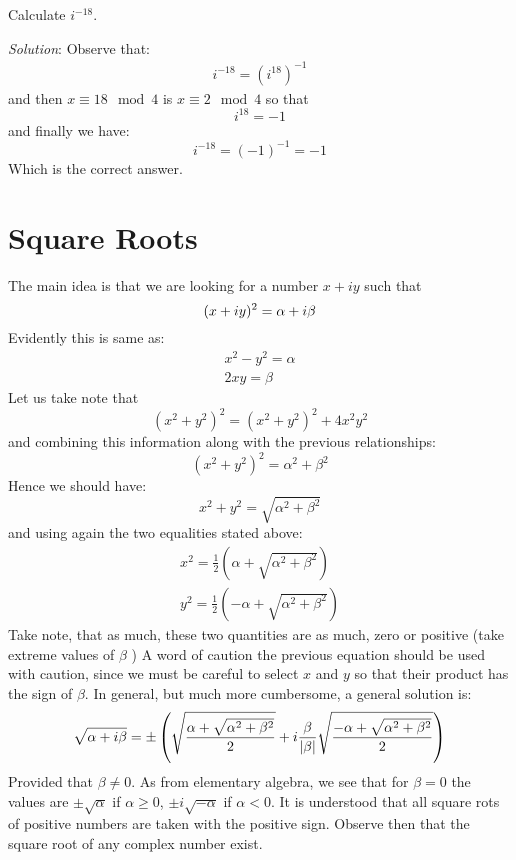 \begin{mdframed}
	Calculate $i^{-18}$.
	
	\textit{Solution}: Observe that:
	\begin{align*}
	i^{-18} = (i^{18})^{-1}
	\end{align*}
	and then $ x \equiv 18 \mod{4} $ is $ x \equiv 2 \mod{4} $ so that 
	\[ i^{18} = -1 \]
	and finally we have:
	\[ i^{-18} = (-1)^{-1} = -1 \]
	Which is the correct answer.
	
\end{mdframed}

\section{Square Roots}
The main idea is that we are looking for a number $ x + iy$ such that
\[ 
(x + iy)^{2} = \alpha + i \beta 
 \]
 Evidently this is same as:
 \begin{align*}
 x^2 - y^2 = \alpha \\
 2xy = \beta
 \end{align*}
Let us take note that
\[ 
(x^{2}+y^{2})^{2} = (x^2 + y^2)^2 + 4x^2y^2
\]
and combining this information along with the previous relationships:
\[ (x^{2}+y^{2})^{2} = \alpha^2 + \beta^2 \]
Hence we should have:
\[ x^2 + y^2 = \sqrt{ \alpha^2 + \beta^2 } \]
and using again the two equalities stated above:
\begin{align*}
x^2 = \frac{1}{2}( \alpha + \sqrt{\alpha^2 + \beta^2}) \\
y^2 = \frac{1}{2}( -\alpha + \sqrt{ \alpha^2 + \beta^2}  )
\end{align*}
Take note, that as much, these two quantities are as much, zero or positive (take extreme values of $\beta$ )
A word of caution the previous equation should be used with caution, since we must be careful to select $x$ and $y$ so that their product has the sign of $\beta$.
In general, but much more cumbersome, a general solution is:
 \begin{align*}
  \sqrt{\alpha + i \beta }= \pm \left( \sqrt{ \frac{ \alpha + \sqrt{\alpha^2 + \beta^2} }{2}} + i \frac{\beta}{\left| \beta \right|} \sqrt{ \frac{ -\alpha + \sqrt{\alpha^2 + \beta^2}}{2}} \right)
 \end{align*}
 Provided that $ \beta \neq 0 $. As from elementary algebra, we see that for $ \beta = 0$ the values are $ \pm \sqrt{\alpha} $ if $ \alpha \geq 0$, $\pm i \sqrt{-\alpha} $ if $ \alpha < 0$. It is understood that all square rots of positive numbers are taken with the positive sign.
 Observe then that the square root of any complex number exist.
 
 
 



